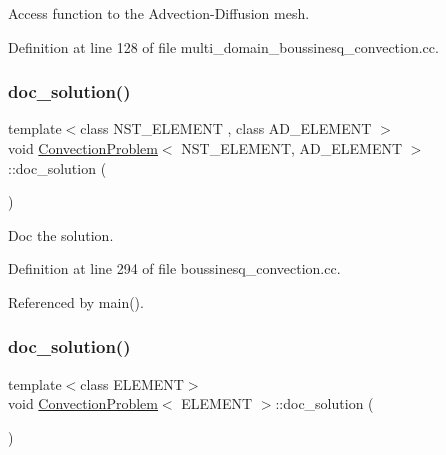 Access function to the Advection-\/\+Diffusion mesh. 



Definition at line 128 of file multi\+\_\+domain\+\_\+boussinesq\+\_\+convection.\+cc.

\mbox{\label{classConvectionProblem_ab7d9e5ac641ca08dd8b04c5eec179593}} 
\subsubsection{\texorpdfstring{doc\+\_\+solution()}{doc\_solution()}\hspace{0.1cm}{\footnotesize\ttfamily [1/2]}}
{\footnotesize\ttfamily template$<$class N\+S\+T\+\_\+\+E\+L\+E\+M\+E\+NT , class A\+D\+\_\+\+E\+L\+E\+M\+E\+NT $>$ \\
void \hyperlink{classConvectionProblem}{Convection\+Problem}$<$ N\+S\+T\+\_\+\+E\+L\+E\+M\+E\+NT, A\+D\+\_\+\+E\+L\+E\+M\+E\+NT $>$\+::doc\+\_\+solution (\begin{DoxyParamCaption}{ }\end{DoxyParamCaption})}



Doc the solution. 



Definition at line 294 of file boussinesq\+\_\+convection.\+cc.



Referenced by main().

\mbox{\label{classConvectionProblem_a577e6ccb8106cbf3b2cede3bf4af7c24}} 
\subsubsection{\texorpdfstring{doc\+\_\+solution()}{doc\_solution()}\hspace{0.1cm}{\footnotesize\ttfamily [2/2]}}
{\footnotesize\ttfamily template$<$class E\+L\+E\+M\+E\+NT$>$ \\
void \hyperlink{classConvectionProblem}{Convection\+Problem}$<$ E\+L\+E\+M\+E\+NT $>$\+::doc\+\_\+solution (\begin{DoxyParamCaption}{ }\end{DoxyParamCaption})}



